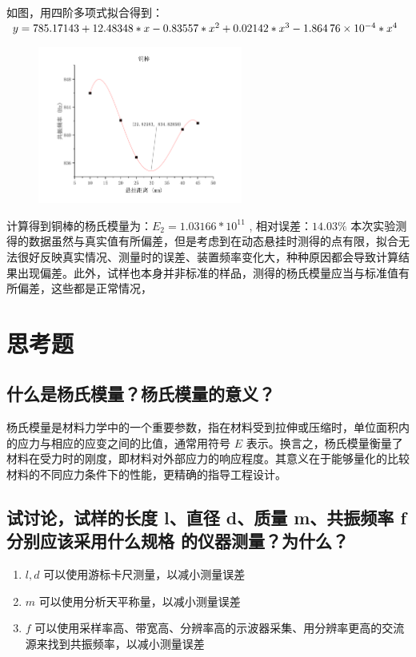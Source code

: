 \documentclass[a4paper,utf8]{article}
\begin{document}
    如图，用四阶多项式拟合得到：$ y =  785.17143 + 12.48348 * x  -0.83557 * x^2 + 0.02142 * x^3 - \num{1.86476E-4} * x^4 $ \par
    \begin{figure}[!ht]
        \includegraphics[width=0.6\textwidth]{fig2.pdf}
    \end{figure}\par
    计算得到铜棒的杨氏模量为：$E_2=1.03166*10^{11}$ , $\text{相对误差：} 14.03 \%$\newpage
    本次实验测得的数据虽然与真实值有所偏差，但是考虑到在动态悬挂时测得的点有限，拟合无法很好反映真实情况、测量时的误差、装置频率变化大，种种原因都会导致计算结果出现偏差。此外，试样也本身并非标准的样品，测得的杨氏模量应当与标准值有所偏差，这些都是正常情况，
\section{思考题}
    \subsection{什么是杨氏模量？杨氏模量的意义？} 
    杨氏模量是材料力学中的一个重要参数，指在材料受到拉伸或压缩时，单位面积内的应力与相应的应变之间的比值，通常用符号 $E$ 表示。换言之，杨氏模量衡量了材料在受力时的刚度，即材料对外部应力的响应程度。其意义在于能够量化的比较材料的不同应力条件下的性能，更精确的指导工程设计。
    \subsection{试讨论，试样的长度 l、直径 d、质量 m、共振频率 f 分别应该采用什么规格
    的仪器测量？为什么？} 
    \begin{enumerate}
        \item $l,d$ 可以使用游标卡尺测量，以减小测量误差
        \item $m$ 可以使用分析天平称量，以减小测量误差
        \item $f$ 可以使用采样率高、带宽高、分辨率高的示波器采集、用分辨率更高的交流源来找到共振频率，以减小测量误差
    \end{enumerate}
\newpage
\end{document}
